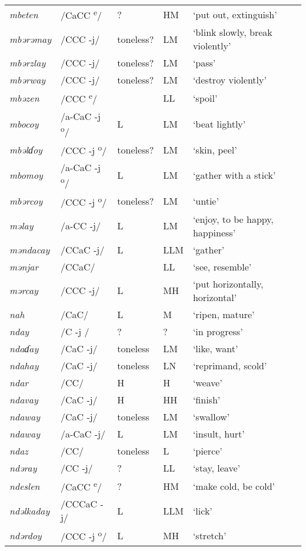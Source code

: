\begin{small}
\begin{longtable}{lp{1.75cm}p{1.75cm}p{1.75cm}p{3cm}}
\textit{mbeten} & /CaCC \textsuperscript{e}/ & ? & HM & ‘put out, extinguish’\\
\textit{mbərəmay} & /CCC -j/ & toneless? & LM & ‘blink slowly, break violently’\\
\textit{mbərzlay} & /CCC -j/ & toneless? & LM & ‘pass’\\
\textit{mbərway} & /CCC -j/ & toneless? & LM & ‘destroy violently’\\
\textit{mbəzen} & /CCC \textsuperscript{e}/ &  & LL & ‘spoil’\\
\textit{mbocoy} & /a-CaC -j\textsuperscript{ o}/ & L & LM & ‘beat lightly’\\
\textit{mbəlɗoy} & /CCC -j\textsuperscript{ o}/ & toneless? & LM & ‘skin, peel’\\
\textit{mbomoy} & /a-CaC -j\textsuperscript{ o}/ & L & LM & ‘gather with a stick’\\
\textit{mbərcoy} & /CCC -j\textsuperscript{ o}/ & toneless? & LM & ‘untie’\\
\textit{məlay} & /a-CC -j/ & L & LM & ‘enjoy, to be happy, happiness’\\
\textit{məndacay} & /CCaC -j/ & L & LLM & ‘gather’\\
\textit{mənjar } & /CCaC/ &  & LL & ‘see, resemble’\\
\textit{mərcay} & /CCC -j/ & L & MH & ‘put horizontally, horizontal’\\
\textit{nah} & /CaC/ & L & M & ‘ripen, mature’\\
\textit{nday} & /C -j / & ? & ? & ‘in progress’\\
\textit{ndaɗay} & /CaC -j/ & toneless & LM & ‘like, want’\\
\textit{ndahay} & /CaC -j/ & toneless & LN & ‘reprimand, scold’\\
\textit{ndar} & /CC/ & H & H & ‘weave’\\
\textit{ndavay} & /CaC -j/ & H & HH & ‘finish’\\
\textit{ndaway} & /CaC -j/ & toneless & LM & ‘swallow’\\
\textit{ndaway} & /a-CaC -j/ & L & LM & ‘insult, hurt’\\
\textit{ndaz} & /CC/ & toneless & L & ‘pierce’\\
\textit{ndəray} & /CC -j/ & ? & LL & ‘stay, leave’\\
\textit{ndeslen} & /CaCC \textsuperscript{e}/ & ? & HM & ‘make cold, be cold’\\
\textit{ndəlkaday} & /CCCaC -j/ & L & LLM & ‘lick’\\
\textit{ndərdoy} & /CCC -j\textsuperscript{ o}/ & L & MH & ‘stretch’\\

\end{longtable}
\end{small}
